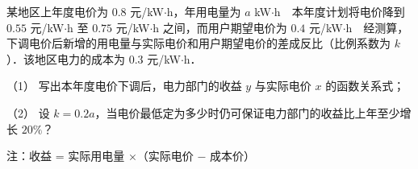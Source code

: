 \begin{question}
某地区上年度电价为 $0.8$ 元/kW$\cdot$h，年用电量为 $a$ kW$\cdot$h　本年度计划将电价降到 $0.55$ 元/kW$\cdot$h 至 $0.75$ 元/kW$\cdot$h 之间，而用户期望电价为 $0.4$ 元/kW$\cdot$h　经测算，下调电价后新增的用电量与实际电价和用户期望电价的差成反比（比例系数为 $k$）．该地区电力的成本为 $0.3$ 元/kW$\cdot$h．

（1） 写出本年度电价下调后，电力部门的收益 $y$ 与实际电价 $x$ 的函数关系式；

（2） 设 $k = 0.2a$，当电价最低定为多少时仍可保证电力部门的收益比上年至少增长 $20\%$？

注：收益 = 实际用电量 ×（实际电价 $-$ 成本价）

\par\medskip

\end{question}